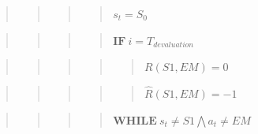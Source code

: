 \documentclass[10pt,a4paper,onecolumn]{article}
\begin{document}
\begin{quote}
\begin{quote}
\begin{quote}
\begin{quote}
\(s_t = S_0\)
\end{quote}
\end{quote}
\end{quote}
\end{quote}

\begin{quote}
\begin{quote}
\begin{quote}
\begin{quote}
\(\textbf{IF}\ i = T_{devaluation}\)
\end{quote}
\end{quote}
\end{quote}
\end{quote}

\begin{quote}
\begin{quote}
\begin{quote}
\begin{quote}
\begin{quote}
\(R(S1, EM) = 0\)
\end{quote}
\end{quote}
\end{quote}
\end{quote}
\end{quote}

\begin{quote}
\begin{quote}
\begin{quote}
\begin{quote}
\begin{quote}
\(\hat{R}(S1, EM) = -1\)
\end{quote}
\end{quote}
\end{quote}
\end{quote}
\end{quote}

\begin{quote}
\begin{quote}
\begin{quote}
\begin{quote}
\(\textbf{WHILE}\ s_t \neq S1 \bigwedge a_t \neq EM\)
\end{quote}
\end{quote}
\end{quote}
\end{quote}
\end{document}
